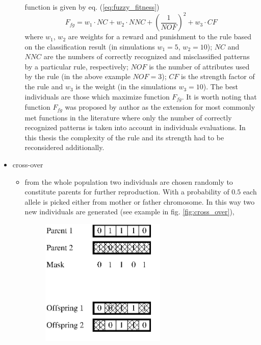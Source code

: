\begin{itemize}
\begin{itemize}
                function is given by eq. (\ref{eq:fuzzy_fitness})
                \begin{equation}
                    F_{fg} = w_1\cdot NC + w_2\cdot NNC + (\frac{1}{NOF})^2 +
                    w_3\cdot CF
                    \label{eq:fuzzy_fitness}
                \end{equation}
                where $w_1$, $w_2$ are weights for a reward and punishment to
                the rule based on the classification result (in simulations
                $w_1=5$, $w_2=10$); $NC$ and $NNC$ are
                the numbers of correctly recognized and misclassified patterns
                by a particular rule, respectively; $NOF$ is the number of
                attributes used by the rule (in the above example $NOF=3$);
                $CF$ is the strength factor of the rule and $w_3$ is the
                weight (in the simulations $w_3=10$).
                The best individuals are those which maximize function
                $F_{fg}$. It is worth noting that function $F_{fg}$ was
                proposed by author as the extension for most commonly met
                functions in the literature where only the number of correctly
                recognized patterns is taken into account in individuals
                evaluations. In this thesis the complexity of the rule and its
                strength had to be reconsidered additionally.
        \end{itemize}
    \item cross-over
        \begin{itemize}
            \item from the whole population two individuals are chosen
                randomly to constitute parents for further reproduction. With a
                probability of $0.5$ each allele is picked either from mother
                or father chromosome. In this way two new
                individuals are generated (see example in fig.
                \ref{fig:cross_over}),
                \begin{figure}[H]
                    \begin{center}
                        \includegraphics[width=0.6\textwidth, height=0.5\textwidth]{fig/cross_over.png}

\end{center}
\end{figure}
\end{itemize}
\end{itemize}
